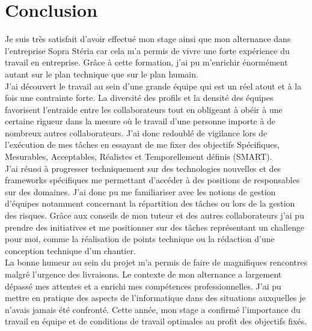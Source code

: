 \documentclass[12pt,a4paper]{article}
\begin{document}
\section{Conclusion}
Je suis très satisfait d’avoir effectué mon stage ainsi que mon alternance dans l'entreprise Sopra Stéria car cela m’a permis de vivre une forte expérience du travail en entreprise. Grâce à cette formation, j’ai pu m’enrichir énormément autant sur le plan technique que sur le plan humain.\\
J’ai découvert le travail au sein d'une grande équipe qui est un réel atout et à la fois une contrainte forte. La diversité des profils et la densité des équipes favorisent l'entraide entre les collaborateurs tout en obligeant à obéir à une certaine rigueur dans la mesure où le travail d'une personne importe à de nombreux autres collaborateurs. J’ai donc redoublé de vigilance lors de l’exécution de mes tâches en essayant de me fixer des objectifs Spécifiques, Mesurables, Acceptables, Réalistes et Temporellement définis (SMART).\\
J'ai réussi à progresser techniquement sur des technologies nouvelles et des frameworks spécifiques me permettant d'accéder à des positions de responsables sur des domaines. J'ai donc pu me familiariser avec les notions de gestion d'équipes notamment concernant la répartition des tâches ou lors de la gestion des risques. Grâce aux conseils de mon tuteur et des autres collaborateurs j'ai pu prendre des initiatives et me positionner sur des tâches représentant un challenge pour moi, comme la réalisation de points technique ou la rédaction d'une conception technique d'un chantier. \\
La bonne humeur au sein du projet m'a permis de faire de magnifiques rencontres malgré l’urgence des livraisons. Le contexte de mon alternance a largement dépassé mes attentes et a enrichi mes compétences professionnelles. J'ai pu mettre en pratique des aspects de l'informatique dans des situations auxquelles je n'avais jamais été confronté.
Cette année, mon stage a confirmé l'importance du travail en équipe et de conditions de travail optimales au profit des objectifs fixés.
\newpage
\end{document}
